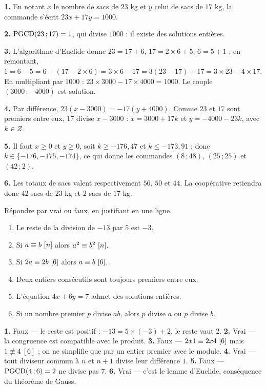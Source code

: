 \begin{corrige}
\textbf{1.} En notant $x$ le nombre de sacs de $23$ kg et $y$ celui de sacs de
$17$ kg, la commande s'écrit $23x+17y = 1000$.

\textbf{2.} $\operatorname{PGCD}(23\,;17) = 1$, qui divise $1000$ : il existe des solutions
entières.

\textbf{3.} L'algorithme d'Euclide donne $23 = 17+6$, $17 = 2\times6+5$,
$6 = 5+1$ ; en remontant, $1 = 6-5 = 6-(17-2\times6) = 3\times6-17
= 3(23-17)-17 = 3\times23-4\times17$. En multipliant par $1000$ :
$23\times3000-17\times4000 = 1000$. Le couple $(3000\,;-4000)$ est solution.

\textbf{4.} Par différence, $23(x-3000) = -17(y+4000)$. Comme $23$ et $17$
sont premiers entre eux, $17$ divise $x-3000$ : $x = 3000+17k$ et
$y = -4000-23k$, avec $k \in Z$.

\textbf{5.} Il faut $x \geq 0$ et $y \geq 0$, soit
$k \geq -176{,}47$ et $k \leq -173{,}91$ : donc $k \in \{-176,-175,-174\}$,
ce qui donne les commandes $(8\,;48)$, $(25\,;25)$ et $(42\,;2)$.

\textbf{6.} Les totaux de sacs valent respectivement $56$, $50$ et $44$. La
coopérative retiendra donc $42$ sacs de $23$ kg et $2$ sacs de $17$ kg.
\end{corrige}

\begin{jemeteste}
Répondre par vrai ou faux, en justifiant en une ligne.

\begin{enumerate}[label=\textbf{\arabic*.}, leftmargin=*, itemsep=0.28em]
  \item Le reste de la division de $-13$ par $5$ est $-3$.
  \item Si $a \equiv b \ [n]$ alors $a^{2} \equiv b^{2} \ [n]$.
  \item Si $2a \equiv 2b \ [6]$ alors $a \equiv b \ [6]$.
  \item Deux entiers consécutifs sont toujours premiers entre eux.
  \item L'équation $4x+6y = 7$ admet des solutions entières.
  \item Si un nombre premier $p$ divise $ab$, alors $p$ divise $a$ ou $p$
        divise $b$.
\end{enumerate}
\end{jemeteste}

\begin{corrige}[je me teste]
\textbf{1.} Faux — le reste est positif : $-13 = 5\times(-3)+2$, le reste vaut
$2$.
\textbf{2.} Vrai — la congruence est compatible avec le produit.
\textbf{3.} Faux — $2x1 \equiv 2x4 \ [6]$ mais
$1 \not\equiv 4 \ [6]$ ; on ne simplifie que par un entier premier avec le
module.
\textbf{4.} Vrai — tout diviseur commun à $n$ et $n+1$ divise leur différence
$1$.
\textbf{5.} Faux — $\operatorname{PGCD}(4\,;6) = 2$ ne divise pas $7$.
\textbf{6.} Vrai — c'est le lemme d'Euclide, conséquence du théorème de Gauss.
\end{corrige}

